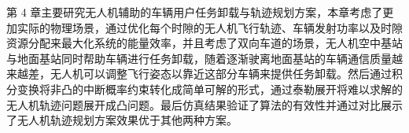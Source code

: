 第 4 章主要研究无人机辅助的车辆用户任务卸载与轨迹规划方案，本章考虑了更加实际的物理场景，通过优化每个时隙的无人机飞行轨迹、车辆发射功率以及时隙资源分配来最大化系统的能量效率，并且考虑了双向车道的场景，无人机空中基站与地面基站同时帮助车辆进行任务卸载，随着逐渐驶离地面基站的车辆通信质量越来越差，无人机可以调整飞行姿态以靠近这部分车辆来提供任务卸载。然后通过积分变换将非凸的中断概率约束转化成简单可解的形式，通过泰勒展开将难以求解的无人机轨迹问题展开成凸问题。最后仿真结果验证了算法的有效性并通过对比展示了无人机轨迹规划方案效果优于其他两种方案。

